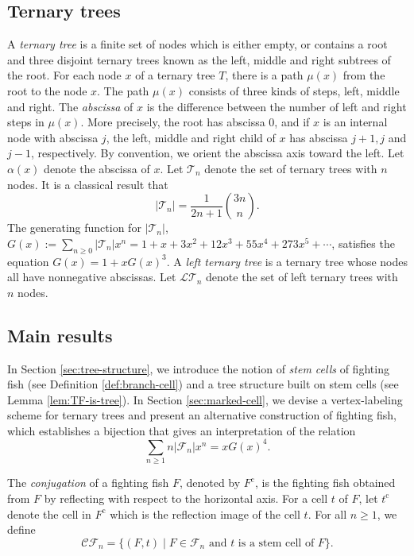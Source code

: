 \documentclass[a4paper,11pt,reqno]{amsart}
\theoremstyle{definition}
\numberwithin{equation}{section}
\newcommand{\cc}{{\mathrm{c}}}
\newcommand{\CF}{{\mathcal{CF}}}
\newcommand{\LT}{{\mathcal{LT}}}
\newcommand{\F}{{\mathcal{F}}}
\newcommand{\T}{{\mathcal{T}}}
\begin{document}
\subsection{Ternary trees}
A \emph{ternary tree} is a finite set of nodes which is either empty, or contains a root and three disjoint ternary trees known as the left, middle and right subtrees of the root.
For each node $x$ of a ternary tree $T$,
there is a path $\mu(x)$ from the root to the node $x$. The path $\mu(x)$ consists of three kinds of steps, left, middle and right. The \emph{abscissa} of $x$ is the difference between the number of 
left and right steps in $\mu(x)$. More precisely, the root has abscissa 0, and if $x$ is an internal node with abscissa $j$, the left, middle and right child of $x$ has abscissa $j+1,j$ and $j-1$, respectively.  By convention, we orient the abscissa axis toward the left. Let $\alpha(x)$ denote the abscissa of $x$. Let $\T_n$ denote the set of ternary trees with $n$ nodes. It is a classical result \cite[A001764]{oeis} that
\begin{equation} \label{eqn:ternary_tree_number}
|\T_n|=\frac{1}{2n+1}\binom{3n}{n}.
\end{equation}
The generating function for $|\T_n|$, $G(x):=\sum_{n\ge 0} |\T_n|x^n = 1+x+3x^2+12x^3+55x^4+273x^5+\cdots$, satisfies the equation $G(x)=1+xG(x)^3$.
A \emph{left ternary tree} is a ternary tree whose nodes all have nonnegative abscissas. Let $\LT_n$ denote the set of left ternary trees with $n$ nodes. 

\subsection{Main results} 
In Section \ref{sec:tree-structure}, we introduce the notion of \emph{stem cells} of fighting fish (see Definition \ref{def:branch-cell}) and a tree structure built on stem cells (see Lemma \ref{lem:TF-is-tree}). In Section \ref{sec:marked-cell}, we devise a vertex-labeling scheme for ternary trees and present an alternative construction of fighting fish, which establishes a bijection that gives an interpretation of the relation 
\begin{equation} \label{eqn:relation}
\sum_{n\ge 1} n|\F_n|x^n = xG(x)^4.
\end{equation} 



The \emph{conjugation} of a fighting fish $F$, denoted by $F^{\cc}$, is the fighting fish obtained from $F$ by reflecting with respect to the horizontal axis. For a cell $t$ of $F$, let $t^{\cc}$ denote the cell in $F^{\cc}$ which is the reflection image of the cell $t$. For all $n\ge 1$, we define
\begin{equation} \label{eqn:fish-cells}
\CF_n =\{(F,t)\mid F\in\F_n \mbox{ and $t$ is a stem cell of $F$}\}.
\end{equation}
\end{document}
